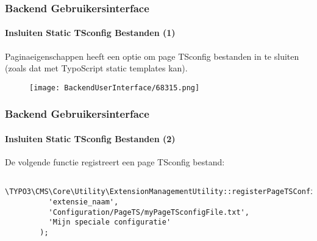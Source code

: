 \begin{frame}[fragile]
	\frametitle{Backend Gebruikersinterface}
	\framesubtitle{Insluiten Static TSconfig Bestanden (1)}

	Paginaeigenschappen heeft een optie om page TSconfig bestanden in te
	sluiten (zoals dat met TypoScript static templates kan).

	\begin{figure}
		\texttt{[image: BackendUserInterface/68315.png]}
	\end{figure}

\end{frame}

\begin{frame}[fragile]
	\frametitle{Backend Gebruikersinterface}
	\framesubtitle{Insluiten Static TSconfig Bestanden (2)}

	\lstset{basicstyle=\tiny\ttfamily}

	De volgende functie registreert een page TSconfig bestand:

	\begin{lstlisting}
		\TYPO3\CMS\Core\Utility\ExtensionManagementUtility::registerPageTSConfigFile(
		  'extensie_naam',
		  'Configuration/PageTS/myPageTSconfigFile.txt',
		  'Mijn speciale configuratie'
		);
	\end{lstlisting}

\end{frame}


